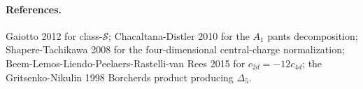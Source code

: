 \paragraph{References.}
Gaiotto 2012 for class-$\mathcal S$; Chacaltana-Distler 2010 for the
$A_1$ pants decomposition; Shapere-Tachikawa 2008 for the
four-dimensional central-charge normalization;
Beem-Lemos-Liendo-Peelaers-Rastelli-van Rees 2015 for
$c_{2d}=-12c_{4d}$; the Gritsenko-Nikulin 1998 Borcherds product
producing $\Delta_5$.
